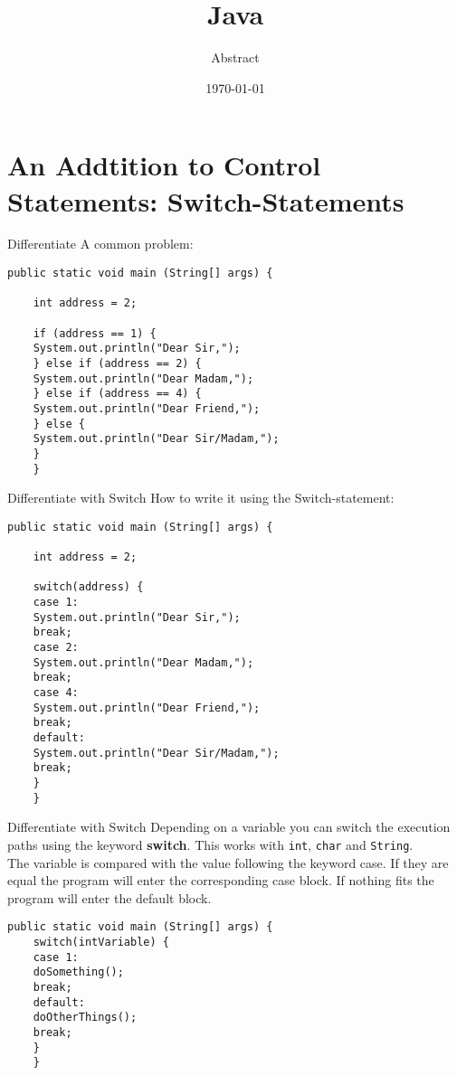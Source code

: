 


\title{Java}
\subtitle{Abstract}
\date{\today}

\usepackage{tabularx}



\begin{frame}
	\titlepage
\end{frame}

\begin{frame}
	\tableofcontents
\end{frame}

\section{An Addtition to Control Statements: Switch-Statements}
\begin{frame}[fragile]{Differentiate}
	A common problem:
	\begin{lstlisting}[basicstyle=\ttfamily\scriptsize]
	public static void main (String[] args) {
	
	int address = 2;
	
	if (address == 1) {
	System.out.println("Dear Sir,");	    
	} else if (address == 2) {
	System.out.println("Dear Madam,");		    
	} else if (address == 4) {
	System.out.println("Dear Friend,");		    
	} else {
	System.out.println("Dear Sir/Madam,");	
	}
	}
	\end{lstlisting}
\end{frame}
\begin{frame}[fragile]{Differentiate with Switch}
	How to write it using the Switch-statement:
	\begin{lstlisting}[basicstyle=\ttfamily\scriptsize]
	public static void main (String[] args) {
	
	int address = 2;
	
	switch(address) {
	case 1:
	System.out.println("Dear Sir,");
	break;
	case 2:
	System.out.println("Dear Madam,");
	break;
	case 4:
	System.out.println("Dear Friend,");
	break; 
	default:
	System.out.println("Dear Sir/Madam,");
	break;
	}
	}
	\end{lstlisting}
\end{frame}
\begin{frame}[fragile]{Differentiate with Switch}
	Depending on a variable you can switch the execution paths using the keyword \textbf{switch}.
	This works with \texttt{int}, \texttt{char} and \texttt{String}. \\
	\vfill
	The variable is compared 
	with the value following the keyword case.
	If they are equal the program will enter the corresponding case block.
	If nothing fits the program will enter the default block.
	\begin{lstlisting}[basicstyle=\ttfamily\scriptsize]
	public static void main (String[] args) {
	switch(intVariable) {
	case 1:
	doSomething();
	break;
	default:
	doOtherThings();
	break;
	}
	}
	\end{lstlisting}
\end{frame}

